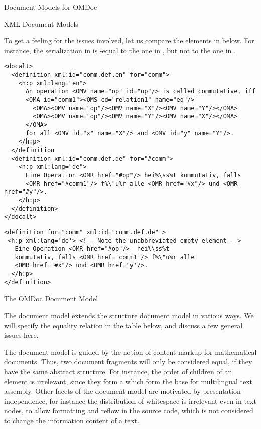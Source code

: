 \begin{module}[id=document-model]
\begin{omgroup}[id=document-model]{Document Models for OMDoc}
\begin{omgroup}[id=xml-DOM]{XML Document Models}
\begin{module}[id=XMLDom]
To get a feeling for the issues involved, let us compare the \omdoc elements in
{} below. For instance, the serialization in {}
is {\xml}-equal to the one in {}, but not to the one in
{}.

\begin{lstlisting}[escapechar=\%,label=lst:first,
   index={definition,OMA},caption={An \omdoc Definition}]
<docalt>
  <definition xml:id="comm.def.en" for="comm">
    <h:p xml:lang="en">
      An operation <OMV name="op" id="op"/> is called commutative, iff 
      <OMA id="comm1"><OMS cd="relation1" name="eq"/>
        <OMA><OMV name="op"/><OMV name="X"/><OMV name="Y"/></OMA>
        <OMA><OMV name="op"/><OMV name="Y"/><OMV name="X"/></OMA>
      </OMA>
      for all <OMV id="x" name="X"/> and <OMV id="y" name="Y"/>.
    </h:p>
  </definition
  <definition xml:id="comm.def.de" for="#comm">
    <h:p xml:lang="de">
      Eine Operation <OMR href="#op"/> hei%\ss%t kommutativ, falls 
      <OMR href="#comm1"/> f%\"u%r alle <OMR href="#x"/> und <OMR href="#y"/>.
    </h:p>
  </definition>
</docalt>
\end{lstlisting}

\begin{lstlisting}[escapechar=\%,label=lst:second,mathescape,
   index={definition,h:p},
   caption={An {\xml}-equal serialization for {\mylstref{first}}}]
<definition for="comm" xml:id="comm.def.de" >
 <h:p xml:lang='de'> <!-- Note the unabbreviated empty element -->
   Eine Operation <OMR href="#op"/>  hei%\ss%t 
   kommutativ, falls <OMR href='comm1'/> f%\"u%r alle 
   <OMR href="#x"/> und <OMR href='y'/>.
  </h:p>
</definition>
\end{lstlisting}
\end{module}
\end{omgroup}

\begin{omgroup}[id=omdom]{The OMDoc Document Model}
\begin{module}[id=omdom]

The \omdoc document model extends the {\xml} structure document model in various ways.
We will specify the equality relation in the table below, and discuss a few general issues
here.

The \omdoc document model is guided by the notion of content markup for mathematical
documents. Thus, two document fragments will only be considered equal, if they have the
same abstract structure. For instance, the order of children of an 
element is irrelevant, since they form a {} which form the
base for multilingual text assembly. Other facets of the \omdoc document model are
motivated by presentation-independence, for instance the distribution of whitespace is
irrelevant even in text nodes, to allow formatting and reflow in the source code, which is
not considered to change the information content of a text.


\end{module}
\end{omgroup}
\end{omgroup}
\end{module}

